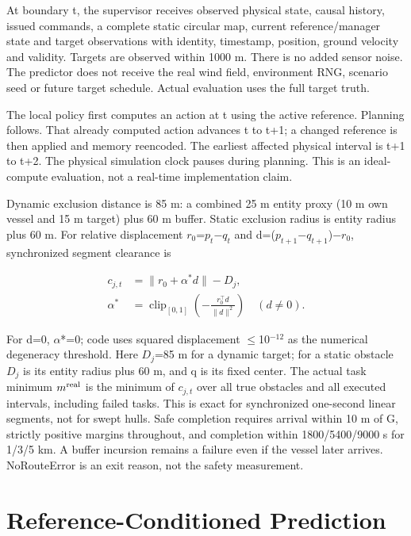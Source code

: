 \documentclass[conference]{IEEEtran}
\begin{document}
At boundary t, the supervisor receives observed physical state, causal history, issued commands, a complete static circular map, current reference/manager state and target observations with identity, timestamp, position, ground velocity and validity. Targets are observed within 1000 m. There is no added sensor noise. The predictor does not receive the real wind field, environment RNG, scenario seed or future target schedule. Actual evaluation uses the full target truth.

The local policy first computes an action at t using the active reference. Planning follows. That already computed action advances t to t+1; a changed reference is then applied and memory reencoded. The earliest affected physical interval is t+1 to t+2. The physical simulation clock pauses during planning. This is an ideal-compute evaluation, not a real-time implementation claim.

Dynamic exclusion distance is 85 m: a combined 25 m entity proxy (10 m own vessel and 15 m target) plus 60 m buffer. Static exclusion radius is entity radius plus 60 m. For relative displacement $r_0$=$p_t$\ensuremath{-}$q_t$ and d=($p_{t+1}$\ensuremath{-}$q_{t+1}$)\ensuremath{-}$r_0$, synchronized segment clearance is

\begin{equation}\label{eq:1}
\begin{aligned}c_{j,t}&=\|r_0+\alpha^*d\|-D_j,\\\alpha^*&=\operatorname{clip}_{[0,1]}\!\left(-\frac{r_0^\top d}{\|d\|^2}\right)\quad(d\ne0).\end{aligned}
\end{equation}

For d=0, \ensuremath{\alpha}*=0; code uses squared displacement \ensuremath{\le}10$^{-12}$ as the numerical degeneracy threshold. Here $D_j$=85 m for a dynamic target; for a static obstacle $D_j$ is its entity radius plus 60 m, and q is its fixed center. The actual task minimum $m^{\rm real}$ is the minimum of $c_{j,t}$ over all true obstacles and all executed intervals, including failed tasks. This is exact for synchronized one-second linear segments, not for swept hulls. Safe completion requires arrival within 10 m of G, strictly positive margins throughout, and completion within 1800/5400/9000 s for 1/3/5 km. A buffer incursion remains a failure even if the vessel later arrives. NoRouteError is an exit reason, not the safety measurement.

\section{Reference-Conditioned Prediction}
\end{document}
